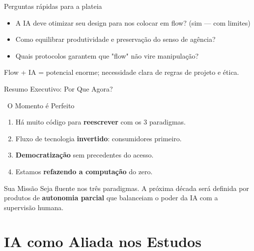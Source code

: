 \documentclass[aspectratio=169,12pt]{beamer}
\begin{document}
\begin{frame}{Perguntas rápidas para a plateia}
  \begin{itemize}
    \item A IA deve otimizar seu design para nos colocar em flow? (sim — com limites)
    \item Como equilibrar produtividade e preservação do senso de agência?
    \item Quais protocolos garantem que "flow" não vire manipulação?
  \end{itemize}
  Flow + IA = potencial enorme; necessidade clara de regras de projeto e ética. 
\end{frame}


\begin{frame}{Resumo Executivo: Por Que Agora?}
    \begin{block}{\faRocket\, O Momento é Perfeito}
        \begin{enumerate}
            \item Há muito código para \textbf{reescrever} com os 3 paradigmas.
            \item Fluxo de tecnologia \textbf{invertido}: consumidores primeiro.
            \item \textbf{Democratização} sem precedentes do acesso.
            \item Estamos \textbf{refazendo a computação} do zero.
        \end{enumerate}
    \end{block}
    
    \begin{alertblock}{Sua Missão}
        Seja fluente nos três paradigmas. A próxima década será definida por produtos de \textbf{autonomia parcial} que balanceiam o poder da IA com a supervisão humana.
    \end{alertblock}
\end{frame}

\section{IA como Aliada nos Estudos}
\end{document}
